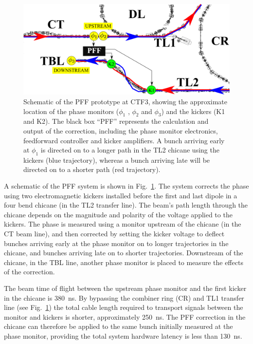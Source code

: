 \documentclass[%
 reprint,
superscriptaddress,
 amsmath,amssymb,
 prl,
]{revtex4-1}
\begin{document}
\begin{figure}
	\includegraphics[width=\textwidth]{figs/ctfpffLayout}%
	\caption{\label{fig:pffLayout}Schematic of the PFF prototype at CTF3, 
	showing the approximate location of the phase monitors (\(\phi_1\) , 
	\(\phi_2\) and \(\phi_3\)) and
		the kickers (K1 and K2). The black box “PFF” represents the calculation 
		and output of the correction, including the phase monitor
		electronics, feedforward controller and kicker amplifiers. A bunch 
		arriving early at \(\phi_1\) is directed on to a longer path in the TL2 
		chicane
		using the kickers (blue trajectory), whereas a bunch arriving late will 
		be directed on to a shorter path (red trajectory). }
\end{figure}

A schematic of the PFF system is shown in Fig.~\ref{fig:pffLayout}. The system 
corrects the phase using two electromagnetic kickers installed 
before the first and last dipole in a four bend chicane (in the TL2 transfer 
line). The beam's path length 
through the chicane depends on the magnitude and polarity of the voltage 
applied to the kickers. The phase is measured using a monitor upstream of 
the chicane (in the CT beam line), and then corrected by setting the kicker 
voltage to deflect bunches arriving early at the phase monitor on to longer 
trajectories in the chicane, and bunches arriving late on to shorter 
trajectories. Downstream of the chicane, in the TBL line, another phase monitor 
is placed to measure the effects of the correction.

The beam time of flight between the upstream phase monitor and the first kicker 
in the chicane is 380~ns. By bypassing the combiner ring (CR) and TL1 transfer 
line (see Fig.~\ref{fig:pffLayout}) the total cable length required to 
transport signals between the monitor and kickers is shorter, approximately 
250~ns. The PFF correction in the chicane can therefore be applied to the same 
bunch initially measured at the phase monitor, providing the total system 
hardware latency is less than 130~ns. 
\end{document}
